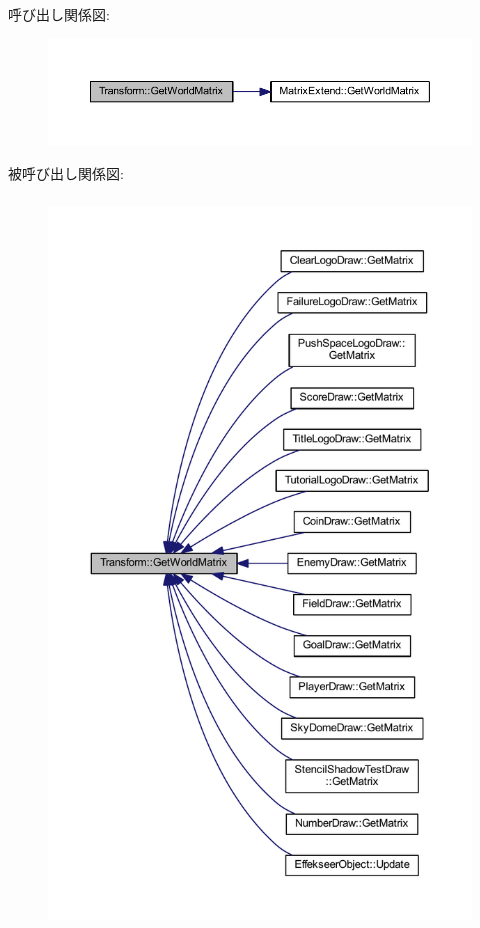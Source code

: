 呼び出し関係図\+:\nopagebreak
\begin{figure}[H]
\begin{center}
\leavevmode
\includegraphics[width=350pt]{class_transform_a060f9487a18ad34549eab53a7ca5100d_cgraph}
\end{center}
\end{figure}
被呼び出し関係図\+:\nopagebreak
\begin{figure}[H]
\begin{center}
\leavevmode
\includegraphics[height=550pt]{class_transform_a060f9487a18ad34549eab53a7ca5100d_icgraph}
\end{center}
\end{figure}
\mbox{\label{class_transform_ab6f7342cb4eca555c02a85c999d499dc}} 
